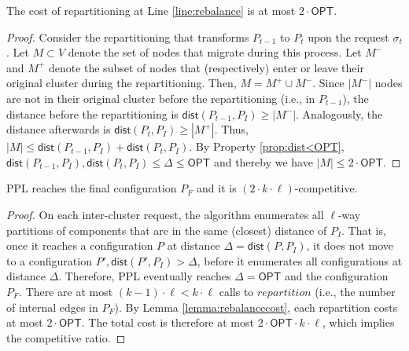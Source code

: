 \documentclass[manuscript,screen=true, review, anonymous]{acmart}
\newcommand{\OPT}{\textsf{OPT}\xspace}
\newcommand{\PPL}{\textsf{PPL}\xspace}
\newcommand{\dist}{\textsf{dist}}
\newcommand\mahmoud[1]{\color{green}\textbf{\\ Mahmoud: #1}\\\color{black}}
\begin{document}
\begin{lemma}	\label{lemma:rebalancecost}
    The cost of repartitioning at Line \ref{line:rebalance} is at most $2\cdot\OPT$.
\end{lemma}
\begin{proof}
    Consider the repartitioning that transforms $P_{t-1}$ to $P_t$ upon the request $\sigma_t$.
    Let $M \subset V$ denote the set of nodes that migrate during this process.
	Let $M^-$ and $M^+$ denote the subset of nodes that (respectively)
    enter or leave their original cluster during the repartitioning.    
    Then,
    $M = M^+ \cup M^-$.
    Since $|M^-|$ nodes are not in their original cluster before the repartitioning (i.e., in $P_{t-1}$),
    the distance before the repartitioning is $\dist(P_{t-1},P_I) \geq | M^-|$.
    Analogously,
     the distance afterwards is $\dist(P_{t},P_I) \geq | M^+|$.
    Thus,
    $|M| \leq \dist(P_{t-1},P_I) + \dist(P_{t},P_I)$.
    By Property \ref{prop:dist<OPT},
    $\dist(P_{t-1},P_I) , \dist(P_{t},P_I) \leq \Delta \leq \OPT$
    and thereby we have	
    $|M| \leq 2\cdot\OPT$.
\end{proof}

\begin{theorem}	\label{thm:upperbound}
    \PPL reaches the final configuration $P_F$ and it is $(2\cdot k\cdot\ell)$-competitive.
\end{theorem}
\begin{proof}
      On each inter-cluster request,
     the algorithm enumerates all $\ell$-way partitions of components
     that are in the same (closest) distance of $P_I$.
     That is, 
     once it reaches a configuration $P$ at distance $\Delta = \dist(P, P_I)$,
     it does not move to a configuration
     $P', \dist(P', P_I) > \Delta$,
     before it enumerates all configurations at distance $\Delta$.
     Therefore,
     \PPL eventually reaches $\Delta=\OPT$ and the configuration $P_F$.
    There are at most $(k-1)\cdot\ell < k\cdot\ell $ calls   to $\mathit{repartition}$
     (i.e., the number of internal edges in $P_F$).
    By Lemma \ref{lemma:rebalancecost},
    each repartition costs at most $2\cdot\OPT$.
    The total cost is therefore at most $2\cdot\OPT\cdot k\cdot\ell$, which implies the competitive ratio.
 \end{proof}
\end{document}
